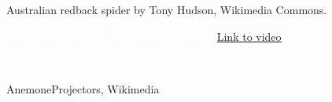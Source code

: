 \documentclass[t]{beamer}
\begin{document}
{
\begin{frame}



\tinyfill Australian redback spider by Tony Hudson, Wikimedia Commons.
\end{frame}
}


{
\begin{frame}




\vfilll

\tiny \textcolor{white}{Oliver Koemmerling, Wikimedia Commons.\hfill \href{http://www.youtube.com/watch?v=KYp_Xi4AtAQ}{Link to video} \hfill \phantom{.}} 

\end{frame}
}


{
\begin{frame}{\textcolor{white}{Does sexual selection occur in humans?}}


\tinyfill AnemoneProjectors, Wikimedia
\end{frame}
}


\end{document}
